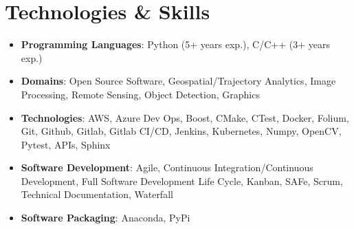 \documentclass[letterpaper,10pt]{article}
\makeatletter
\newcommand{\resumeAwardItem}[3]{
  \item
    \begin{tabular*}{0.97\textwidth}{l@{\extracolsep{\fill}}r}
      \textbf{#1} \textit{\small #2} & \textit{\small #3} \\
    \end{tabular*}
}
\newcommand{\resumeSubHeadingListStart}{\begin{itemize}[leftmargin=*]}
\newcommand{\resumeSubHeadingListEnd}{\end{itemize}}
\makeatother
\begin{document}
\section{Technologies \& Skills}
 \resumeSubHeadingListStart
   \item{
     \textbf{Programming Languages}{: Python (5+ years exp.), C/C++ (3+ years exp.) }
   }
   \item{
    \textbf{Domains}{: Open Source Software, Geospatial/Trajectory Analytics, Image Processing, Remote Sensing, Object Detection, Graphics}
   }
   \item{
    \textbf{Technologies}{: AWS, Azure Dev Ops, Boost, CMake, CTest, Docker, Folium, Git, Github, Gitlab, Gitlab CI/CD, Jenkins, Kubernetes, Numpy, OpenCV, Pytest, APIs, Sphinx}
   }
   \item{
    \textbf{Software Development}{: Agile, Continuous Integration/Continuous Development, Full Software Development Life Cycle, Kanban, SAFe, Scrum, Technical Documentation, Waterfall}
   }
   \item{
    \textbf{Software Packaging}{: Anaconda, PyPi}
   }
 \resumeSubHeadingListEnd



\end{document}
